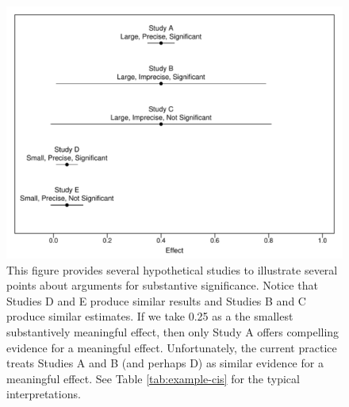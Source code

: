 \documentclass[12pt]{article}
\begin{document}
\begin{figure}[h]
\begin{center}
\includegraphics[scale = .6]{figs/example-cis.pdf}
\caption{This figure provides several hypothetical studies to illustrate several points about arguments for substantive significance. Notice that Studies D and E produce similar results and Studies B and C produce similar estimates. If we take 0.25 as a the smallest substantively meaningful effect, then only Study A offers compelling evidence for a meaningful effect. Unfortunately, the current practice treats Studies A and B (and perhaps D) as similar evidence for a meaningful effect. See Table \ref{tab:example-cis} for the typical interpretations.}\label{fig:example-cis}
\end{center}
\end{figure}
\end{document}
